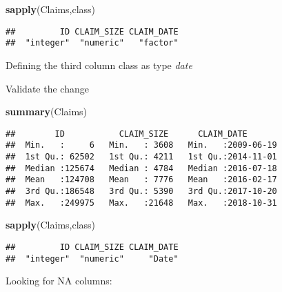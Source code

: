 \documentclass[]{article}
\newenvironment{Shaded}{\begin{snugshade}}{\end{snugshade}}
\newcommand{\KeywordTok}[1]{\textcolor[rgb]{0.13,0.29,0.53}{\textbf{#1}}}
\newcommand{\DataTypeTok}[1]{\textcolor[rgb]{0.13,0.29,0.53}{#1}}
\newcommand{\DecValTok}[1]{\textcolor[rgb]{0.00,0.00,0.81}{#1}}
\newcommand{\StringTok}[1]{\textcolor[rgb]{0.31,0.60,0.02}{#1}}
\newcommand{\NormalTok}[1]{#1}
\begin{document}
\begin{Shaded}
\begin{Highlighting}[]
\KeywordTok{sapply}\NormalTok{(Claims,class)}
\end{Highlighting}
\end{Shaded}

\begin{verbatim}
##         ID CLAIM_SIZE CLAIM_DATE 
##  "integer"  "numeric"   "factor"
\end{verbatim}

Defining the third column class as type \emph{date}

\begin{Shaded}
\end{Shaded}

Validate the change

\begin{Shaded}
\begin{Highlighting}[]
\KeywordTok{summary}\NormalTok{(Claims)}
\end{Highlighting}
\end{Shaded}

\begin{verbatim}
##        ID           CLAIM_SIZE      CLAIM_DATE        
##  Min.   :     6   Min.   : 3608   Min.   :2009-06-19  
##  1st Qu.: 62502   1st Qu.: 4211   1st Qu.:2014-11-01  
##  Median :125674   Median : 4784   Median :2016-07-18  
##  Mean   :124708   Mean   : 7776   Mean   :2016-02-17  
##  3rd Qu.:186548   3rd Qu.: 5390   3rd Qu.:2017-10-20  
##  Max.   :249975   Max.   :21648   Max.   :2018-10-31
\end{verbatim}

\begin{Shaded}
\begin{Highlighting}[]
\KeywordTok{sapply}\NormalTok{(Claims,class)}
\end{Highlighting}
\end{Shaded}

\begin{verbatim}
##         ID CLAIM_SIZE CLAIM_DATE 
##  "integer"  "numeric"     "Date"
\end{verbatim}

Looking for NA columns:
\end{document}
